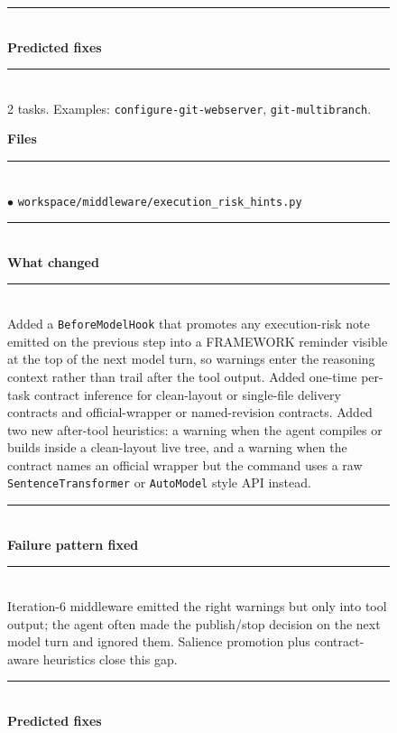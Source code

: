 \begin{figure}[t]
\begin{tcbraster}
\begin{tcolorbox}[colback=aheSky!18,colframe=aheNavy,colbacktitle=aheNavy,
                          title={\scriptsize\textbf{chg-1, iteration 8, commit \texttt{ca35f53}, level: tool implementation}}]
            \rule{\linewidth}{0.3pt}\\
            \textbf{\textcolor{aheNavy}{Predicted fixes}} \\
            \rule{\linewidth}{0.3pt}\\[1pt]
            2 tasks. Examples: \texttt{configure-git-webserver}, \texttt{git-multibranch}.
        \end{tcolorbox}
        \begin{tcolorbox}[colback=aheTeal!12,colframe=aheBlue,colbacktitle=aheBlue,
                          title={\scriptsize\textbf{chg-2, iteration 8, commit \texttt{a4a4a29}, level: middleware}}]
            \textbf{\textcolor{aheBlue}{Files}} \\
            \rule{\linewidth}{0.3pt}\\[1pt]
            $\bullet$ \texttt{workspace/middleware/execution\_risk\_hints.py} \\[3pt]
            \rule{\linewidth}{0.3pt}\\
            \textbf{\textcolor{aheBlue}{What changed}} \\
            \rule{\linewidth}{0.3pt}\\[1pt]
            Added a \texttt{BeforeModelHook} that promotes any execution-risk note emitted on the previous step into a FRAMEWORK reminder visible at the top of the next model turn, so warnings enter the reasoning context rather than trail after the tool output. Added one-time per-task contract inference for clean-layout or single-file delivery contracts and official-wrapper or named-revision contracts. Added two new after-tool heuristics: a warning when the agent compiles or builds inside a clean-layout live tree, and a warning when the contract names an official wrapper but the command uses a raw \texttt{SentenceTransformer} or \texttt{AutoModel} style API instead. \\[3pt]
            \rule{\linewidth}{0.3pt}\\
            \textbf{\textcolor{aheBlue}{Failure pattern fixed}} \\
            \rule{\linewidth}{0.3pt}\\[1pt]
            Iteration-6 middleware emitted the right warnings but only into tool output; the agent often made the publish/stop decision on the next model turn and ignored them. Salience promotion plus contract-aware heuristics close this gap. \\[3pt]
            \rule{\linewidth}{0.3pt}\\
            \textbf{\textcolor{aheBlue}{Predicted fixes}} \\

\end{tcolorbox}
\end{tcbraster}
\end{figure}

